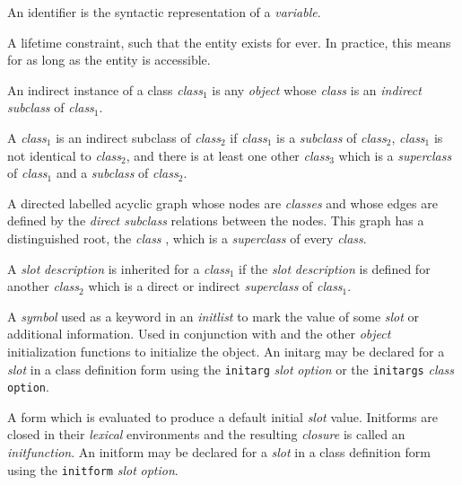 \begin{optDefinition}
\begin{definitions}
     An identifier is the
    syntactic representation of a {\em variable}.

     A lifetime
    constraint, such that the entity exists for ever.  In practice, this means
    for as long as the entity is accessible.

     An indirect instance of a
    class {\em class$_1$} is any {\em object} whose {\em class} is an {\em
        indirect} {\em subclass} of {\em class$_1$}.

     A {\em class$_1$} is an
    indirect subclass of {\em class$_2$} if {\em class$_1$} is a {\em subclass}
    of {\em class$_2$}, {\em class$_1$} is not identical to {\em class$_2$}, and
    there is at least one other {\em class$_3$} which is a {\em superclass} of
    {\em class$_1$} and a {\em subclass} of {\em class$_2$}.

      A directed
    labelled acyclic graph whose nodes are {\em classes} and whose edges are
    defined by the {\em direct subclass} relations between the nodes.  This
    graph has a distinguished root, the {\em class} , which is
    a {\em superclass} of every {\em class}.

     A {\em slot} {\em description} is inherited for a {\em
        class$_1$} if the {\em slot} {\em description} is defined for another
    {\em class$_2$} which is a direct or indirect {\em superclass} of {\em
        class$_1$}.

      A {\em symbol} used as a
    keyword in an {\em initlist} to mark the value of some {\em slot} or
    additional information.  Used in conjunction with  and the
    other {\em object} initialization functions to initialize the object.  An
    initarg may be declared for a {\em slot} in a class definition form using
    the {\tt initarg} {\em slot} {\em option} or the {\tt initargs} {\em class}
    {\tt option}.

      A form which is evaluated to
    produce a default initial {\em slot} value.  Initforms are closed in their
    {\em lexical} environments and the resulting {\em closure} is called an {\em
        initfunction}.  An initform may be declared for a {\em slot} in a class
    definition form using the {\tt initform} {\em slot} {\em option}.


\end{definitions}
\end{optDefinition}
